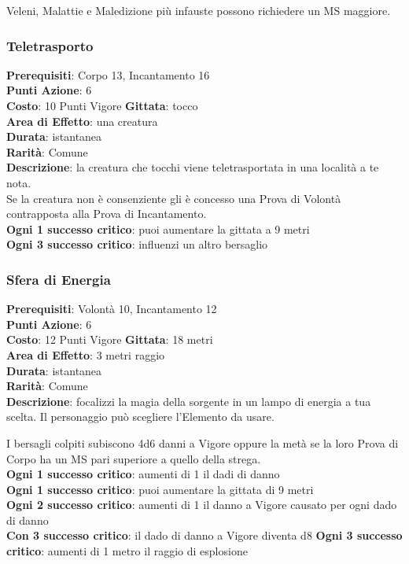 \documentclass[12pt,a4paper,twoside,openany]{book}
\begin{document}
\begin{multicols}{2}
Veleni, Malattie e Maledizione più infauste possono richiedere un MS maggiore.

\subsubsection*{Teletrasporto}
\textbf{Prerequisiti}: Corpo 13, Incantamento 16\\
\textbf{Punti Azione}: 6\\
\textbf{Costo}: 10 Punti Vigore
\textbf{Gittata}: tocco \\
\textbf{Area di Effetto}: una creatura\\
\textbf{Durata}: istantanea\\
\textbf{Rarità}: Comune\\
\textbf{Descrizione}: la creatura che tocchi viene teletrasportata in una località a te nota.\\
Se la creatura non è consenziente gli è concesso una Prova di Volontà contrapposta alla Prova di Incantamento.\\
\textbf{Ogni 1 successo critico}: puoi aumentare la gittata a 9 metri\\
\textbf{Ogni 3 successo critico}: influenzi un altro bersaglio 

\subsubsection*{Sfera di Energia}
\textbf{Prerequisiti}: Volontà 10, Incantamento 12\\
\textbf{Punti Azione}: 6\\
\textbf{Costo}: 12 Punti Vigore
\textbf{Gittata}: 18 metri\\
\textbf{Area di Effetto}: 3 metri raggio\\
\textbf{Durata}: istantanea\\
\textbf{Rarità}: Comune\\
\textbf{Descrizione}: focalizzi la magia della sorgente in un lampo di energia a tua scelta. Il personaggio può scegliere l'Elemento da usare.

I bersagli colpiti subiscono 4d6 danni a Vigore oppure la metà se la loro Prova di Corpo ha un MS pari superiore a quello della strega.\\
\textbf{Ogni 1 successo critico}: aumenti di 1 il dadi di danno\\
\textbf{Ogni 1 successo critico}: puoi aumentare la gittata di 9 metri\\
\textbf{Ogni 2 successo critico}: aumenti di 1 il danno a Vigore causato per ogni dado di danno\\
\textbf{Con 3 successo critico}: il dado di danno a Vigore diventa d8
\textbf{Ogni 3 successo critico}: aumenti di 1 metro il raggio di esplosione


\end{multicols}
\end{document}
